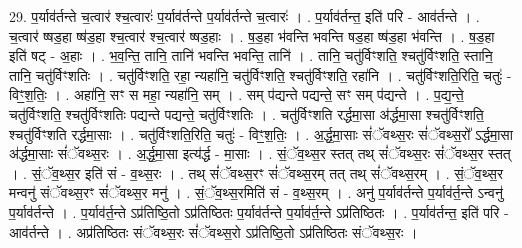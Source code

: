\documentclass[17pt]{extarticle}
\begin{document}
29. प॒र्याव॑र्तन्ते च॒त्वार॑ श्च॒त्वारः॑ प॒र्याव॑र्तन्ते प॒र्याव॑र्तन्ते च॒त्वारः॑ । . प॒र्याव॑र्तन्त॒ इति॑ परि - आव॑र्तन्ते । . च॒त्वार॑ ष्षड॒हा ष्ष॑ड॒हा श्च॒त्वार॑ श्च॒त्वार॑ ष्षड॒हाः । . ष॒ड॒हा भ॑वन्ति भवन्ति षड॒हा ष्ष॑ड॒हा भ॑वन्ति । . ष॒ड॒हा इति॑ षट् - अ॒हाः । . भ॒व॒न्ति॒ तानि॒ तानि॑ भवन्ति भवन्ति॒ तानि॑ । . तानि॒ चतु॑र्विꣳशति॒ श्चतु॑र्विꣳशति॒ स्तानि॒ तानि॒ चतु॑र्विꣳशतिः । . चतु॑र्विꣳशति॒ रहा॒ न्यहा॑नि॒ चतु॑र्विꣳशति॒ श्चतु॑र्विꣳशति॒ रहा॑नि । . चतु॑र्विꣳशति॒रिति॒ चतुः॑ - विꣳ॒॒श॒तिः॒ । . अहा॑नि॒ सꣳ स महा॒ न्यहा॑नि॒ सम् । . सम् प॑द्यन्ते पद्यन्ते॒ सꣳ सम् प॑द्यन्ते । . प॒द्य॒न्ते॒ चतु॑र्विꣳशति॒ श्चतु॑र्विꣳशतिः पद्यन्ते पद्यन्ते॒ चतु॑र्विꣳशतिः । . चतु॑र्विꣳशति रर्द्धमा॒सा अ॑र्द्धमा॒सा श्चतु॑र्विꣳशति॒ श्चतु॑र्विꣳशति रर्द्धमा॒साः । . चतु॑र्विꣳशति॒रिति॒ चतुः॑ - विꣳ॒॒श॒तिः॒ । . अ॒र्द्ध॒मा॒साः सं॑ॅवथ्स॒रः सं॑ॅवथ्स॒रो᳚ ऽर्द्धमा॒सा अ॑र्द्धमा॒साः सं॑ॅवथ्स॒रः । . अ॒र्द्ध॒मा॒सा इत्य॑र्द्ध - मा॒साः । . सं॒ॅव॒थ्स॒र स्तत् तथ् सं॑ॅवथ्स॒रः सं॑ॅवथ्स॒र स्तत् । . सं॒ॅव॒थ्स॒र इति॑ सं - व॒थ्स॒रः । . तथ् सं॑ॅवथ्स॒रꣳ सं॑ॅवथ्स॒रम् तत् तथ् सं॑ॅवथ्स॒रम् । . सं॒ॅव॒थ्स॒र मन्वनु॑ संॅवथ्स॒रꣳ सं॑ॅवथ्स॒र मनु॑ । . सं॒ॅव॒थ्स॒रमिति॑ सं - व॒थ्स॒रम् । . अनु॑ प॒र्याव॑र्तन्ते प॒र्याव॑र्त॒न्ते ऽन्वनु॑ प॒र्याव॑र्तन्ते । . प॒र्याव॑र्त॒न्ते ऽप्र॑तिष्ठि॒तो ऽप्र॑तिष्ठितः प॒र्याव॑र्तन्ते प॒र्याव॑र्त॒न्ते ऽप्र॑तिष्ठितः । . प॒र्याव॑र्तन्त॒ इति॑ परि - आव॑र्तन्ते । . अप्र॑तिष्ठितः संॅवथ्स॒रः सं॑ॅवथ्स॒रो ऽप्र॑तिष्ठि॒तो ऽप्र॑तिष्ठितः संॅवथ्स॒रः । \newline
\end{document}
